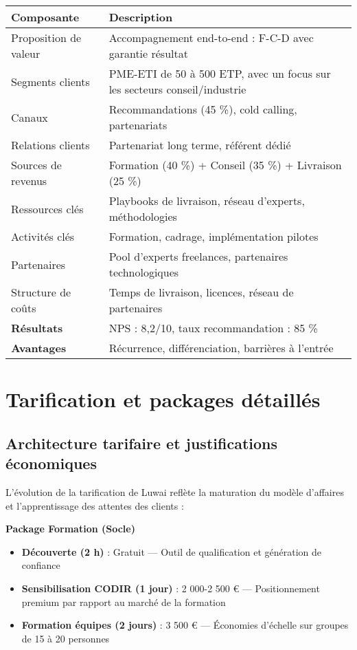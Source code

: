 \begin{longtable}{@{}>{\raggedright\arraybackslash}p{4cm}>{\raggedright\arraybackslash}p{10cm}@{}}
\toprule
\textbf{Composante} & \textbf{Description} \\
\midrule
Proposition de valeur & Accompagnement end-to-end : F-C-D avec garantie résultat \\
Segments clients & PME-ETI de 50 à 500 ETP, avec un focus sur les secteurs conseil/industrie \\
Canaux & Recommandations (45 \%), cold calling, partenariats \\
Relations clients & Partenariat long terme, référent dédié \\
Sources de revenus & Formation (40 \%) + Conseil (35 \%) + Livraison (25 \%) \\
Ressources clés & Playbooks de livraison, réseau d’experts, méthodologies \\
Activités clés & Formation, cadrage, implémentation pilotes \\
Partenaires & Pool d’experts freelances, partenaires technologiques \\
Structure de coûts & Temps de livraison, licences, réseau de partenaires \\
\midrule
\textbf{Résultats} & NPS : 8,2/10, taux recommandation : 85 \% \\
\textbf{Avantages} & Récurrence, différenciation, barrières à l’entrée \\
\bottomrule
\end{longtable}

\section{Tarification et packages détaillés}

\subsection{Architecture tarifaire et justifications économiques}

L’évolution de la tarification de Luwai reflète la maturation du modèle d’affaires et l’apprentissage des attentes des clients :

\textbf{Package Formation (Socle)}
\begin{itemize}
    \item \textbf{Découverte (2 h)} : Gratuit — Outil de qualification et génération de confiance
    \item \textbf{Sensibilisation CODIR (1 jour)} : 2 000-2 500 € — Positionnement premium par rapport au marché de la formation
    \item \textbf{Formation équipes (2 jours)} : 3 500 € — Économies d’échelle sur groupes de 15 à 20 personnes
\end{itemize}

